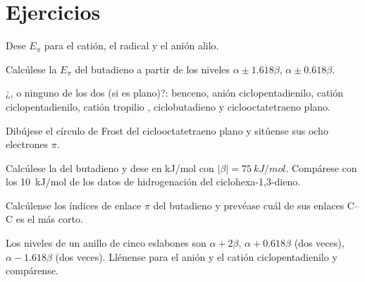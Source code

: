 \section{Ejercicios}

\begin{exercise}[$\star$]\label{exo:b2:huckel:1}
Dese $E_\pi$ para el catión, el radical y el anión alilo.
\end{exercise}

\begin{exercise}[$\star$]\label{exo:b2:huckel:2}
Calcúlese la $E_\pi$ del butadieno a partir de los niveles $\alpha \pm 1.618\beta$, $\alpha \pm 0.618\beta$.
\end{exercise}

\begin{exercise}[$\star$]\label{exo:b2:huckel:3}
¿,  o ninguno de los dos (si es plano)?: benceno, anión ciclopentadienilo,
catión ciclopentadienilo, catión tropilio , ciclobutadieno y
ciclooctatetraeno plano.
\end{exercise}

\begin{exercise}[$\star$]\label{exo:b2:huckel:4}
Dibújese el círculo de Frost del ciclooctatetraeno plano y sitúense sus ocho electrones $\pi$.
\end{exercise}

\begin{exercise}[$\star\star$]\label{exo:b2:huckel:5}
Calcúlese la  del butadieno y dese en \unit{kJ/mol} con
$|\beta| = \qty{75}{kJ/mol}$. Compárese con los \qty{10}{kJ/mol} de los datos de hidrogenación
del ciclohexa-1,3-dieno.
\end{exercise}

\begin{exercise}[$\star\star$]\label{exo:b2:huckel:6}
Calcúlense los índices de enlace $\pi$ del butadieno y prevéase cuál de sus enlaces C--C es el
más corto.
\end{exercise}

\begin{exercise}[$\star\star$]\label{exo:b2:huckel:7}
Los niveles de un anillo de cinco eslabones son $\alpha + 2\beta$, $\alpha + 0.618\beta$ (dos veces),
$\alpha - 1.618\beta$ (dos veces). Llénense para el anión y el catión ciclopentadienilo y
compárense.
\end{exercise}

